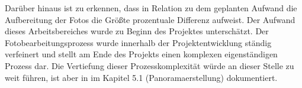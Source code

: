 Darüber hinaus ist zu erkennen, dass in Relation zu dem geplanten Aufwand die Aufbereitung der Fotos die Größte
prozentuale Differenz aufweist. Der Aufwand dieses Arbeitsbereiches wurde zu Beginn des Projektes unterschätzt.
Der Fotobearbeitungsprozess wurde innerhalb der Projektentwicklung ständig verfeinert und stellt am Ende des Projekts
einen komplexen eigenständigen Prozess dar. Die Vertiefung dieser Prozesskomplexität würde an dieser Stelle zu weit
führen, ist aber in \citet{modelierungUndBetrieb2014} im Kapitel 5.1 (Panoramaerstellung) dokumentiert.